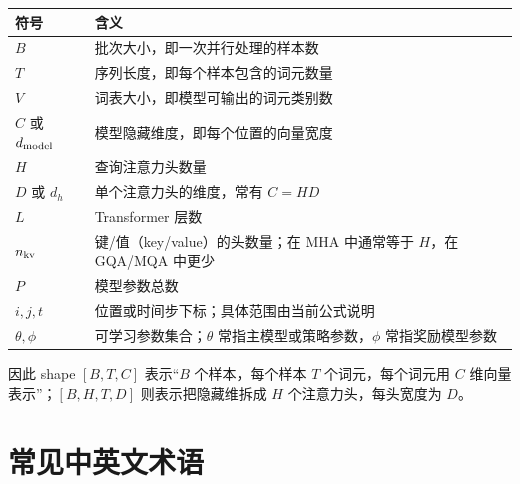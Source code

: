 \documentclass[UTF8,zihao=-4,openany,fontset=fandol]{ctexbook}
\begin{document}
\begin{center}
\begin{tabularx}{0.94\textwidth}{lY}
\toprule
符号 & 含义\\
\midrule
$B$ & 批次大小，即一次并行处理的样本数\\
$T$ & 序列长度，即每个样本包含的词元数量\\
$V$ & 词表大小，即模型可输出的词元类别数\\
$C$ 或 $d_{\rm model}$ & 模型隐藏维度，即每个位置的向量宽度\\
$H$ & 查询注意力头数量\\
$D$ 或 $d_h$ & 单个注意力头的维度，常有 $C=HD$\\
$L$ & Transformer 层数\\
$n_{\rm kv}$ & 键/值（key/value）的头数量；在 MHA 中通常等于 $H$，在 GQA/MQA 中更少\\
$P$ & 模型参数总数\\
$i,j,t$ & 位置或时间步下标；具体范围由当前公式说明\\
$\theta,\phi$ & 可学习参数集合；$\theta$ 常指主模型或策略参数，$\phi$ 常指奖励模型参数\\
\bottomrule
\end{tabularx}
\end{center}

因此 shape $[B,T,C]$ 表示“$B$ 个样本，每个样本 $T$ 个词元，每个词元用 $C$ 维向量表示”；$[B,H,T,D]$ 则表示把隐藏维拆成 $H$ 个注意力头，每头宽度为 $D$。

\section*{常见中英文术语}
\end{document}

